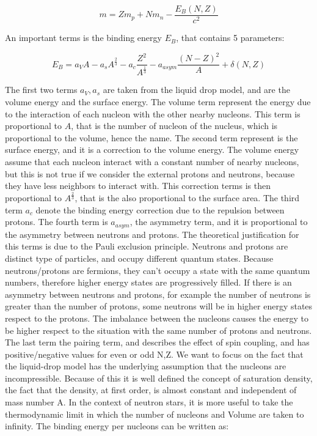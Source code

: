 \begin{equation}
m = Zm_{p} + Nm_{n} - \frac{E_{B}(N,Z)}{c^{2}}
\end{equation}

An important terms is the binding energy $E_{B}$, that contains 5 parameters:

\begin{equation}
E_{B} = a_{V}A -  a_{s}A^{\frac{2}{3}} - a_{c}\dfrac{Z^{2}}{A^{\frac{1}{3}}} -a_{asym}\dfrac{(N - Z)^{2}}{A} + \delta(N,Z)
\end{equation}

The first two terms $a_{V},a_{s}$ are taken from the liquid drop model, and are the volume energy and the surface energy. The volume term represent the energy due to the interaction of each nucleon with the other nearby nucleons. This term is proportional to $A$, that is the number of nucleon of the nucleus, which is proportional to the volume, hence the name. The second term represent is the surface energy, and it is a correction to the volume energy. The volume energy assume that each nucleon interact with a constant number of nearby nucleons, but this is not true if we consider the external protons and neutrons, because they have less neighbors to interact with. This correction terms is then proportional to $A^{\frac{2}{3}}$, that is the also proportional to the surface area. 
The third term $a_{c}$ denote the binding energy correction due to the repulsion between protons. The fourth term is $a_{asym}$, the asymmetry term, and it is proportional to the asymmetry between neutrons and protons. The theoretical justification for this terms is due to the Pauli exclusion principle. Neutrons and protons are distinct type of particles, and occupy different quantum states. Because neutrons/protons are fermions, they can't occupy a state with the same quantum numbers, therefore higher energy states are progressively filled. If there is an asymmetry between neutrons and protons, for example the number of neutrons is greater than the number of protons, some neutrons will be in higher energy states respect to the protons. The imbalance between the nucleons causes the energy to be higher respect to the situation with the same number of protons and neutrons. 
The last term the pairing term, and describes the effect of spin coupling, and has positive/negative values for even or odd N,Z. 
We want to focus on the fact that the liquid-drop model has the underlying assumption that the nucleons are incompressible. Because of this it is well defined the concept of saturation density, the fact that the density, at first order, is almost constant and independent of mass number A.
In the context of neutron stars, it is more useful to take the thermodynamic limit in which the number of nucleons and Volume are taken to infinity. The binding energy per nucleons can be written as:

